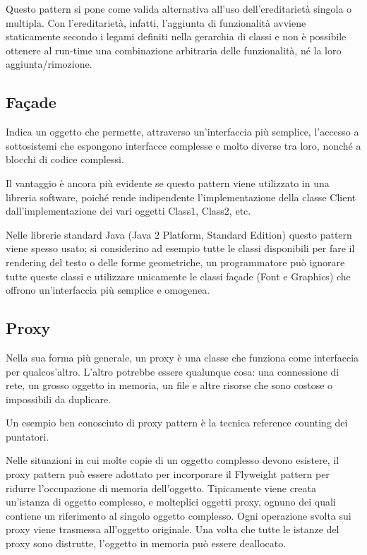 Questo pattern si pone come valida alternativa all'uso dell'ereditarietà singola o multipla. 
Con l'ereditarietà, infatti, l'aggiunta di funzionalità avviene staticamente secondo i legami definiti nella gerarchia di classi e non è possibile ottenere al run-time una combinazione arbitraria delle funzionalità, né la loro aggiunta/rimozione.

\subsection{Façade}
Indica un oggetto che permette, attraverso un'interfaccia più semplice, l'accesso a sottosistemi che espongono interfacce complesse e molto diverse tra loro, nonché a blocchi di codice complessi.

Il vantaggio è ancora più evidente se questo pattern viene utilizzato in una libreria software, poiché rende indipendente l'implementazione della classe Client dall'implementazione dei vari oggetti Class1, Class2, etc.

Nelle librerie standard Java (Java 2 Platform, Standard Edition) questo pattern viene spesso usato; si considerino ad esempio tutte le classi disponibili per fare il rendering del testo o delle forme geometriche, un programmatore può ignorare tutte queste classi e utilizzare unicamente le classi façade (Font e Graphics) che offrono un'interfaccia più semplice e omogenea.

\subsection{Proxy}
Nella sua forma più generale, un proxy è una classe che funziona come interfaccia per qualcos'altro. 
L'altro potrebbe essere qualunque cosa: una connessione di rete, un grosso oggetto in memoria, un file e altre risorse che sono costose o impossibili da duplicare.

Un esempio ben conosciuto di proxy pattern è la tecnica reference counting dei puntatori.

Nelle situazioni in cui molte copie di un oggetto complesso devono esistere, il proxy pattern può essere adottato per incorporare il Flyweight pattern per ridurre l'occupazione di memoria dell'oggetto. Tipicamente viene creata un'istanza di oggetto complesso, e molteplici oggetti proxy, ognuno dei quali contiene un riferimento al singolo oggetto complesso. Ogni operazione svolta sui proxy viene trasmessa all'oggetto originale. Una volta che tutte le istanze del proxy sono distrutte, l'oggetto in memoria può essere deallocato.

